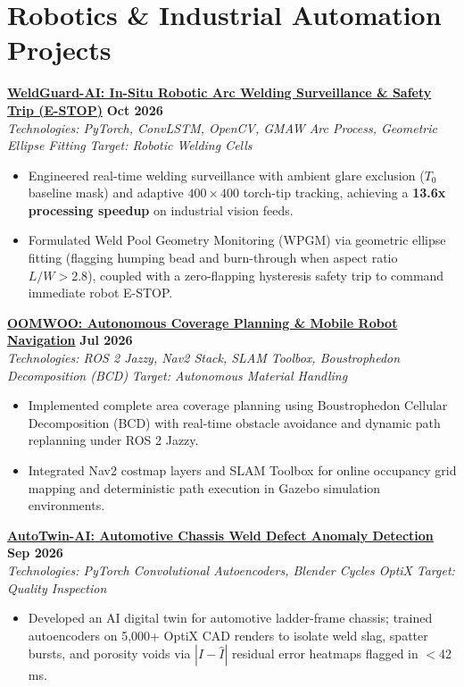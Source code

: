 \documentclass[letterpaper,10pt]{article}
\begin{document}
\section{Robotics \& Industrial Automation Projects}
\noindent
\href{https://github.com/Arkz-Deepak/WeldGuard-AI}{\textbf{WeldGuard-AI: In-Situ Robotic Arc Welding Surveillance \& Safety Trip (E-STOP)}} \hfill \textbf{Oct 2026} \\
\textit{Technologies: PyTorch, ConvLSTM, OpenCV, GMAW Arc Process, Geometric Ellipse Fitting} \hfill \textit{Target: Robotic Welding Cells} \\
\begin{itemize}
    \item Engineered real-time welding surveillance with ambient glare exclusion ($T_0$ baseline mask) and adaptive $400\times400$ torch-tip tracking, achieving a \textbf{13.6x processing speedup} on industrial vision feeds.
    \item Formulated Weld Pool Geometry Monitoring (WPGM) via geometric ellipse fitting (flagging humping bead and burn-through when aspect ratio $L/W > 2.8$), coupled with a zero-flapping hysteresis safety trip to command immediate robot E-STOP.
\end{itemize}
\vspace{2pt}

\noindent
\href{https://github.com/Arkz-Deepak/oomwoo-clean-and-map-arkz}{\textbf{OOMWOO: Autonomous Coverage Planning \& Mobile Robot Navigation}} \hfill \textbf{Jul 2026} \\
\textit{Technologies: ROS 2 Jazzy, Nav2 Stack, SLAM Toolbox, Boustrophedon Decomposition (BCD)} \hfill \textit{Target: Autonomous Material Handling} \\
\begin{itemize}
    \item Implemented complete area coverage planning using Boustrophedon Cellular Decomposition (BCD) with real-time obstacle avoidance and dynamic path replanning under ROS 2 Jazzy.
    \item Integrated Nav2 costmap layers and SLAM Toolbox for online occupancy grid mapping and deterministic path execution in Gazebo simulation environments.
\end{itemize}
\vspace{2pt}

\noindent
\href{https://github.com/Arkz-Deepak/AutoTwin-AI}{\textbf{AutoTwin-AI: Automotive Chassis Weld Defect Anomaly Detection}} \hfill \textbf{Sep 2026} \\
\textit{Technologies: PyTorch Convolutional Autoencoders, Blender Cycles OptiX} \hfill \textit{Target: Quality Inspection} \\
\begin{itemize}
    \item Developed an AI digital twin for automotive ladder-frame chassis; trained autoencoders on 5,000+ OptiX CAD renders to isolate weld slag, spatter bursts, and porosity voids via $|I - \hat{I}|$ residual error heatmaps flagged in $<$42 ms.
\end{itemize}
\vspace{2pt}
\end{document}
